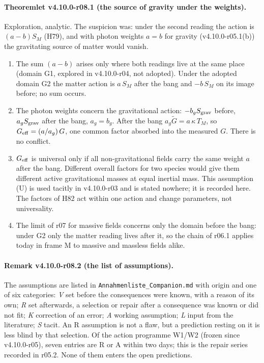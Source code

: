 \paragraph{Theoremlet v4.10.0-r08.1 (the source of gravity under the weights).}
Exploration, analytic.  The suspicion was: under the second reading the action is \((a-b)S_M\) (H79), and with photon weights \(a=b\) for gravity
(v4.10.0-r05.1(b)) the gravitating source of matter would vanish.
\begin{enumerate}[leftmargin=2em]
\item[(a)] The sum \((a-b)\) arises only where both readings live at the same place (domain G1, explored in v4.10.0-r04, not adopted).  Under the
adopted domain G2 the matter action is \(a\,S_M\) after the bang and \(-b\,S_M\) on its image before; no sum occurs.
\item[(b)] The photon weights concern the gravitational action: \(-b_g S_{\rm grav}\) before, \(a_g S_{\rm grav}\) after the bang, \(a_g=b_g\).  After the bang
\(a_g\tilde G=a\,\kappa\,T_M\), so \(G_{\rm eff}=(a/a_g)\,G\), one common factor absorbed into the measured \(G\).  There is no conflict.
\item[(c)] \(G_{\rm eff}\) is universal only if all non-gravitational fields carry the same weight \(a\) after the bang.  Different overall factors for two
species would give them different active gravitational masses at equal inertial mass.  This assumption (U) is used tacitly in v4.10.0-r03 and is
stated nowhere; it is recorded here.  The factors of H82 act within one action and change parameters, not universality.
\item[(d)] The limit of r07 for massive fields concerns only the domain before the bang: under G2 only the matter reading lives after it, so the chain
of r06.1 applies today in frame M to massive and massless fields alike.
\end{enumerate}

\paragraph{Remark v4.10.0-r08.2 (the list of assumptions).}
The assumptions are listed in \texttt{Annahmenliste\_\allowbreak Companion.md} with origin and one of six categories: \emph{V} set before the consequences
were known, with a reason of its own; \emph{R} set afterwards, a selection or repair after a consequence was known or did not fit; \emph{K} correction of an
error; \emph{A} working assumption; \emph{L} input from the literature; \emph{S} tacit.  An R assumption is not a flaw, but a prediction resting on it is less
blind by that selection.  Of the action programme W1/W2 (frozen since v4.10.0-r05), seven entries are R or A within two days; this is the repair series
recorded in r05.2.  None of them enters the open predictions.

